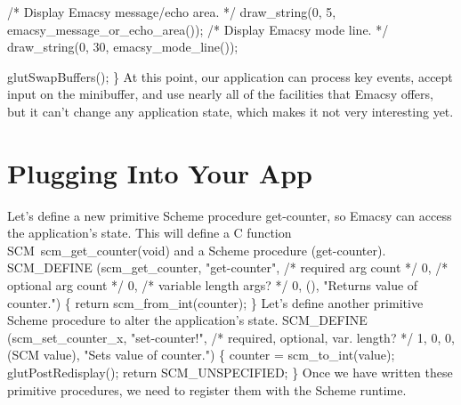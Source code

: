   /* Display Emacsy message/echo area. */
  draw_string(0, 5, emacsy_message_or_echo_area());
  /* Display Emacsy mode line. */
  draw_string(0, 30, emacsy_mode_line());
        
  glutSwapBuffers();
\}
\nwendcode{}\nwdocspar
At this point, our application can process key events, accept input on
the minibuffer, and use nearly all of the facilities that Emacsy
offers, but it can't change any application state, which makes it not
very interesting yet.
\nwenddocs{}\nwdocspar
\section{Plugging Into Your App}

Let's define a new primitive Scheme procedure {\Tt{}get-counter\nwendquote}, so
Emacsy can access the application's state.  This will define
a {\Tt{}C\nwendquote} function {\Tt{}SCM\ scm{\_}get{\_}counter(void)\nwendquote} and a Scheme procedure
{\Tt{}(get-counter)\nwendquote}.
\nwenddocs{}\endmoddef\nwstartdeflinemarkup{}\nwenddeflinemarkup
SCM_DEFINE (scm_get_counter, "get-counter", 
            /* required arg count    */ 0,
            /* optional arg count    */ 0,
            /* variable length args? */ 0,
            (),
            "Returns value of counter.")
\{
  return scm_from_int(counter);
\}
\nwendcode{}Let's define another primitive Scheme procedure to alter the
application's state.
\nwenddocs{}\plusendmoddef\nwstartdeflinemarkup{}\nwenddeflinemarkup
SCM_DEFINE (scm_set_counter_x, "set-counter!", 
         /* required, optional, var. length? */
            1, 0, 0, 
            (SCM value),
            "Sets value of counter.")
\{
  counter = scm_to_int(value);
  glutPostRedisplay();
  return SCM_UNSPECIFIED;
\}
\nwendcode{}Once we have written these primitive procedures, we need to register
them with the Scheme runtime.  

